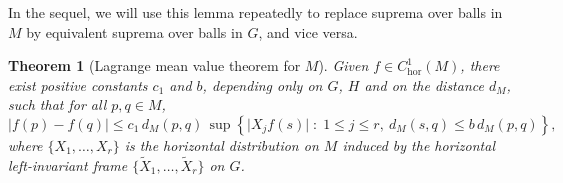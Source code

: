 \documentclass[12pt]{amsart}
\newtheorem{theorem}{Theorem}[section]
\begin{document}
In the sequel, we will use this lemma repeatedly to replace suprema over balls
in $M$ by equivalent suprema over balls in $G$, and vice versa.

\begin{theorem}[Lagrange mean value theorem for $M$]
\label{thm:Lagrange-quotient}
Given $f\in C^1_{\mathrm{hor}}(M)$, there exist positive constants $c_1$ and $b$,
depending only on $G$, $H$ and on the distance $d_M$, such that for all $p,q\in M$,
\begin{equation}\label{FormulaThmLagrange1}
\big| f(p)- f(q)\big|
\leq
c_1\, d_M(p,q)\,
\sup\left\{\big| X_j f(s)\big| \;:\; 1\leq j\leq r,\ d_M(s,q)\leq b\, d_M(p,q)\right\},
\end{equation}
where $\{X_1,\dots,X_r\}$ is the horizontal distribution on $M$ induced by the horizontal
left-invariant frame $\{\tilde X_1,\dots,\tilde X_r\}$ on $G$.
\end{theorem}
\end{document}
